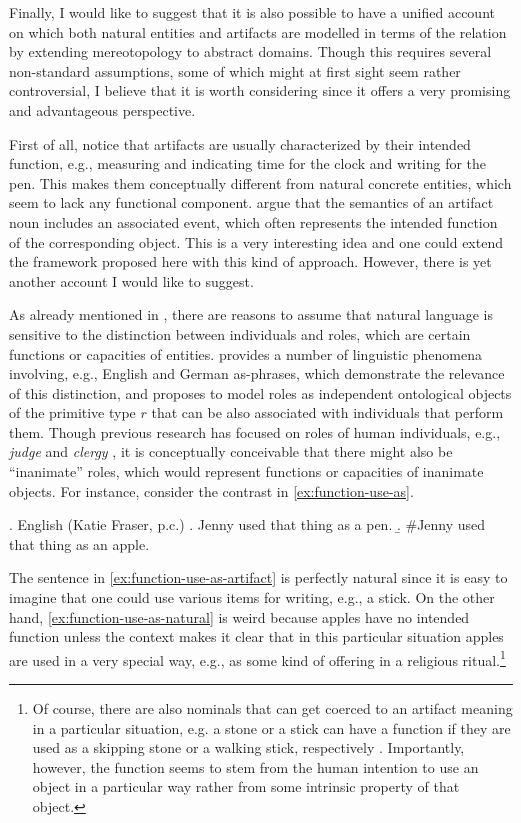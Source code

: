 	Finally, I would like to suggest that it is also possible to have a unified account on which both natural entities and artifacts are modelled in terms of the  relation by extending mereotopology to abstract domains. Though this requires several non-standard assumptions, some of which might at first sight seem rather controversial, I believe that it is worth considering since it offers a very promising and advantageous perspective. 

	First of all, notice that artifacts are usually characterized by their intended function, e.g., measuring and indicating time for the clock and writing for the pen. This makes them conceptually different from natural concrete entities, which seem to lack any functional component. \citet{grimm_levin2017artifacts} argue that the semantics of an artifact noun includes an associated event, which often represents the intended function of the corresponding object. This is a very interesting idea and one could extend the framework proposed here with this kind of approach. However, there is yet another account I would like to suggest.
	
	As already mentioned in , there are reasons to assume that natural language is sensitive to the distinction between individuals and roles, which are certain functions or capacities of entities. \citet{zobel2017sensitivity} provides a number of linguistic phenomena involving, e.g., English and German as-phrases, which demonstrate the relevance of this distinction, and proposes to model roles as independent ontological objects of the primitive type $r$ that can be also associated with individuals that perform them. Though previous research has focused on roles of human individuals, e.g., \textit{judge} \citep{zobel2017sensitivity} and \textit{clergy} \citep{wagiel-toappear-slavic}, it is conceptually conceivable that there might also be ``inanimate'' roles, which would represent functions or capacities of inanimate objects. For instance, consider the contrast in \ref{ex:function-use-as}.
	
	\ex. English (Katie Fraser, p.c.)\label{ex:function-use-as}
	\a. Jenny used that thing as a pen.\label{ex:function-use-as-artifact}
	\b. \#Jenny used that thing as an apple.\label{ex:function-use-as-natural} 
	
	The sentence in \ref{ex:function-use-as-artifact} is perfectly natural since it is easy to imagine that one could use various items for writing, e.g., a stick. On the other hand, \ref{ex:function-use-as-natural} is weird because apples have no intended function unless the context makes it clear that in this particular situation apples are used in a very special way, e.g., as some kind of offering in a religious ritual.\footnote{Of course, there are also nominals that can get coerced to an artifact meaning in a particular situation, e.g. a stone or a stick can have a function if they are used as a skipping stone or a walking stick, respectively \citep[see also][pp. 256--259]{asher2011lexical}. Importantly, however, the function seems to stem from the human intention to use an object in a particular way rather from some intrinsic property of that object.} 
	
